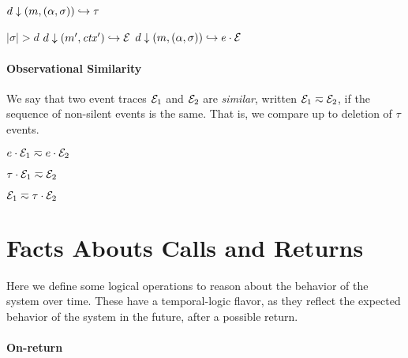 \documentclass[10pt,conference]{ieeetran}%
\theoremstyle{definition}
\begin{document}
         {\(d \downarrow (m,(\alpha,\sigma)) \hookrightarrow \tau\)}

                  {\(|\sigma| > d\)}
                  {\(d \downarrow (m',\mathit{ctx}') \hookrightarrow \mathcal{E}\)}
                  {\(d \downarrow (m,(\alpha,\sigma)) \hookrightarrow e \cdot \mathcal{E}\)}

\paragraph*{Observational Similarity}

We say that two event traces $\mathcal{E}_1$ and $\mathcal{E}_2$ are {\em similar},
written \(\mathcal{E}_1 \eqsim \mathcal{E}_2\), if the sequence of non-silent events
is the same. That is, we compare up to deletion of \(\tau\) events.

\begin{minipage}{.4\columnwidth}
  \judgment{}{\(\obsT \eqsim \obsT\)}
\end{minipage}
\begin{minipage}{.4\columnwidth}
           {\(e \cdot \mathcal{E}_1 \eqsim e \cdot \mathcal{E}_2\)}
\end{minipage}

\begin{minipage}{.4\columnwidth}
           {\(\tau \cdot \mathcal{E}_1 \eqsim \mathcal{E}_2\)}
\end{minipage}
\begin{minipage}{.4\columnwidth}
           {\(\mathcal{E}_1 \eqsim \tau \cdot \mathcal{E}_2\)}
\end{minipage}

\section{Facts Abouts Calls and Returns}

Here we define some logical operations to reason about the behavior of the
system over time. These have a temporal-logic flavor, as they reflect
the expected behavior of the system in the future, after a possible return.

\paragraph*{On-return}
\end{document}
